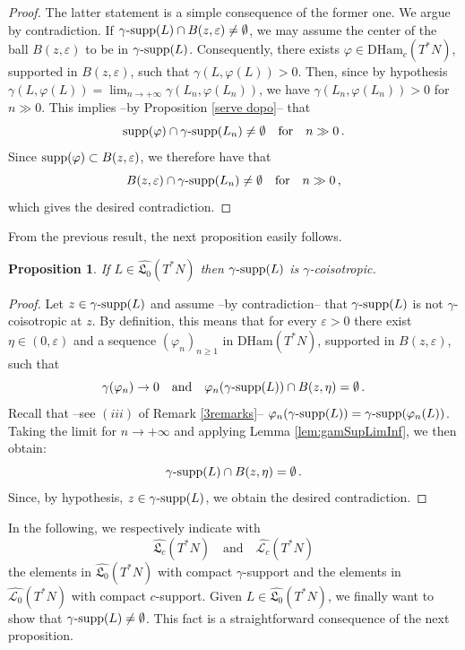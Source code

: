 \documentclass{article}
\newcommand{\1}{\mathbbm{1}}
\newtheorem{prp}[thm]{Proposition}
\theoremstyle{remark}
\begin{document}
{{\begin{proof}The latter statement is a simple consequence of the former one. We argue by contradiction. If $\gamma\textnormal{-supp}(L) \cap B(z, \varepsilon)\ne\emptyset$, we may assume the center of the ball $B(z,\varepsilon)$ to be in $\gamma\textnormal{-supp}(L)$. Consequently, there exists $\varphi \in \mathrm{DHam}_c(T^*N)$, supported in $B(z,\varepsilon)$, such that $\gamma(L,\varphi(L)) > 0$. 
Then, since by hypothesis $\gamma(L,\varphi(L)) = \lim_{n \to +\infty} \gamma(L_n,\varphi(L_n))$, we have $\gamma(L_n,\varphi(L_n)) > 0$ for $n \gg 0$. This implies --by Proposition \ref{serve dopo}-- that $$\textnormal{supp}(\varphi) \cap \gamma\textnormal{-supp}(L_n) \ne \emptyset \quad \text{for} \quad n \gg 0\, .$$ 
Since $\textnormal{supp}(\varphi) \subset B(z,\varepsilon)$, we therefore have that 
$$B(z,\varepsilon) \cap \gamma\textnormal{-supp}(L_n) \ne \emptyset\quad \text{for} \quad n \gg 0\, ,$$  
which gives the desired contradiction. 
\end{proof}
\noindent
From the previous result, the next proposition easily follows. 
\begin{prp} \label{gamma coisotropic}
If $L \in \widehat{\mathfrak{L}_0}(T^*N)$ then $\gamma\textnormal{-supp}(L)$ is $\gamma$-coisotropic.
\end{prp}
\begin{proof}
Let $z \in \gamma\textnormal{-supp}(L)$ and assume --by contradiction-- that $\gamma\textnormal{-supp}(L)$ is not $\gamma$-coisotropic at $z$. By definition, this means that for every $\varepsilon>0$ there exist $\eta \in (0, \varepsilon)$ and a sequence $(\varphi_n)_{n \ge 1}$ in $\mathrm{DHam}(T^*N)$, supported in $B(z,\varepsilon)$, such that
$$\gamma(\varphi_n) \to 0 \quad \text{and} \quad \varphi_n(\gamma\textnormal{-supp}(L)) \cap B(z,\eta) = \emptyset\, .$$
Recall that --see $(iii)$ of Remark \ref{3remarks}-- $\varphi_n(\gamma\textnormal{-supp}(L)) = \gamma\textnormal{-supp}(\varphi_n(L))$. Taking the limit for $n \to +\infty$ and applying Lemma \ref{lem:gamSupLimInf}, we then obtain:
\begin{equation} \label{contra}
\gamma\textnormal{-supp}(L) \cap B(z,\eta) = \emptyset\, .
\end{equation}
Since, by hypothesis, $z \in \gamma\textnormal{-supp}(L)$, we obtain the desired contradiction. 
\end{proof}
\indent In the following, we respectively indicate with 
$$\widehat{\mathfrak{L}_c}(T^*N) \quad \text{and} \quad \widehat{\mathscr{L}_c}(T^*N)$$ 
the elements in $\widehat{\mathfrak{L}_0}(T^*N)$ with compact $\gamma$-support and the elements in $\widehat{\mathscr{L}_0}(T^*N)$ with compact $c$-support. Given $L \in \widehat{\mathfrak{L}_0}(T^*N)$, we finally want to show that $\gamma\textnormal{-supp}(L) \ne \emptyset$. This fact is a straightforward consequence of the next proposition. 
}}
\end{document}
